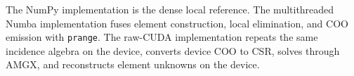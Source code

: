 \documentclass{article}
\begin{document}
The NumPy implementation is the dense local reference.  The multithreaded
Numba implementation fuses element construction, local elimination, and COO
emission with \texttt{prange}.  The raw-CUDA implementation repeats the same
incidence algebra on the device, converts device COO to CSR, solves through
AMGX, and reconstructs element unknowns on the device.
\end{document}
